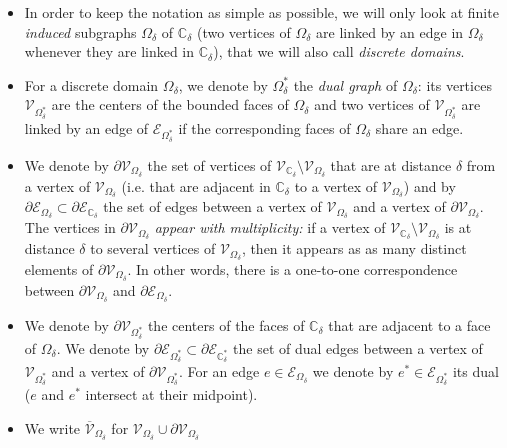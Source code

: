 \documentclass[oneside,english]{amsart}
\numberwithin{equation}{section}
\numberwithin{figure}{section}
\theoremstyle{plain}
\theoremstyle{plain}
\theoremstyle{plain}
\theoremstyle{plain}
\theoremstyle{plain}
\theoremstyle{definition}
\theoremstyle{remark}
\begin{document}
\begin{itemize}
\item In order to keep the notation as simple as possible, we will only
look at finite \emph{induced} subgraphs $\Omega_{\delta}$ of $\mathbb{C}_{\delta}$
(two vertices of $\Omega_{\delta}$ are linked by an edge in $\Omega_{\delta}$
whenever they are linked in $\mathbb{C}_{\delta}$), that we will
also call \emph{discrete domains}.
\item For a discrete domain $\Omega_{\delta}$, we denote by $\Omega_{\delta}^{*}$
the \emph{dual graph} of $\Omega_{\delta}$: its vertices $\mathcal{V}_{\Omega_{\delta}^{*}}$
are the centers of the bounded faces of $\Omega_{\delta}$ and two
vertices of $\mathcal{V}_{\Omega_{\delta}^{*}}$ are linked by an
edge of $\mathcal{E}_{\Omega_{\delta}^{*}}$ if the corresponding
faces of $\Omega_{\delta}$ share an edge.
\item We denote by $\partial\mathcal{V}_{\Omega_{\delta}}$ the set of vertices
of $\mathcal{V}_{\mathbb{C}_{\delta}}\setminus\mathcal{V}_{\Omega_{\delta}}$
that are at distance $\delta$ from a vertex of $\mathcal{V}_{\Omega_{\delta}}$
(i.e. that are adjacent in $\mathbb{C}_{\delta}$ to a vertex of $\mathcal{V}_{\Omega_{\delta}}$)
and by $\partial\mathcal{E}_{\Omega_{\delta}}\subset\partial\mathcal{E}_{\mathbb{C}_{\delta}}$
the set of edges between a vertex of $\mathcal{V}_{\Omega_{\delta}}$
and a vertex of $\partial\mathcal{V}_{\Omega_{\delta}}$. The vertices
in $\partial\mathcal{V}_{\Omega_{\delta}}$ \emph{appear with multiplicity:}
if a vertex of $\mathcal{V}_{\mathbb{C}_{\delta}}\setminus\mathcal{V}_{\Omega_{\delta}}$
is at distance $\delta$ to several vertices of $\mathcal{V}_{\Omega_{\delta}}$,
then it appears as as many distinct elements of $\partial\mathcal{V}_{\Omega_{\delta}}$.
In other words, there is a one-to-one correspondence between $\partial\mathcal{V}_{\Omega_{\delta}}$
and $\partial\mathcal{E}_{\Omega_{\delta}}$.
\item We denote by $\partial\mathcal{V}_{\Omega_{\delta}^{*}}$ the centers
of the faces of $\mathbb{C}_{\delta}$ that are adjacent to a face
of $\Omega_{\delta}$. We denote by $\partial\mathcal{E}_{\Omega_{\delta}^{*}}\subset\partial\mathcal{E}_{\mathbb{C}_{\delta}^{*}}$
the set of dual edges between a vertex of $\mathcal{V}_{\Omega_{\delta}^{*}}$
and a vertex of $\partial\mathcal{V}_{\Omega_{\delta}^{*}}$. For
an edge $e\in\mathcal{E}_{\Omega_{\delta}}$ we denote by $e^{*}\in\mathcal{E}_{\Omega_{\delta}^{*}}$
its dual ($e$ and $e^{*}$ intersect at their midpoint).
\item We write $\overline{\mathcal{V}}_{\Omega_{\delta}}$ for $\mathcal{V}_{\Omega_{\delta}}\cup\partial\mathcal{V}_{\Omega_{\delta}}$

\end{itemize}
\end{document}
